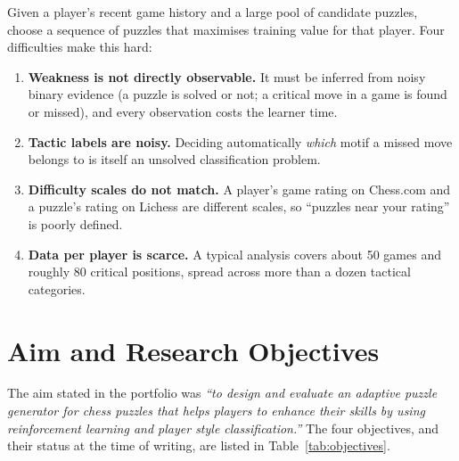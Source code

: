 Given a player's recent game history and a large pool of candidate puzzles, choose a sequence of
puzzles that maximises training value for that player. Four difficulties make this hard:

\begin{enumerate}
  \item \textbf{Weakness is not directly observable.} It must be inferred from noisy binary
        evidence (a puzzle is solved or not; a critical move in a game is found or missed), and every
        observation costs the learner time.
  \item \textbf{Tactic labels are noisy.} Deciding automatically \emph{which} motif a missed move
        belongs to is itself an unsolved classification problem.
  \item \textbf{Difficulty scales do not match.} A player's game rating on Chess.com and a puzzle's
        rating on Lichess are different scales, so ``puzzles near your rating'' is poorly defined.
  \item \textbf{Data per player is scarce.} A typical analysis covers about 50 games and roughly 80
        critical positions, spread across more than a dozen tactical categories.
\end{enumerate}

\section{Aim and Research Objectives}

The aim stated in the portfolio was \emph{``to design and evaluate an adaptive puzzle generator for
chess puzzles that helps players to enhance their skills by using reinforcement learning and player
style classification.''} The four objectives, and their status at the time of writing, are listed
in Table~\ref{tab:objectives}.

